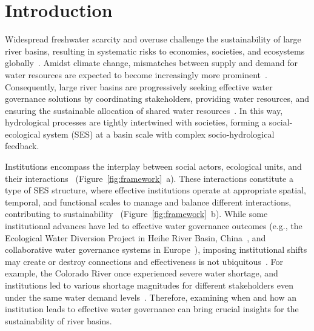\documentclass[preprint, 12pt]{elsarticle}
\begin{document}
\section{Introduction}\label{sec:introduction}
Widespread freshwater scarcity and overuse challenge the sustainability of large river basins, resulting in systematic risks to economies, societies, and ecosystems globally~\cite{distefano2017, dolan2021, xu2020b, mekonnen2016}.
Amidst climate change, mismatches between supply and demand for water resources are expected to become increasingly more prominent~\cite{florke2018, yoon2021}.
Consequently, large river basins are progressively seeking effective water governance solutions by coordinating stakeholders, providing water resources, and ensuring the sustainable allocation of shared water resources~\cite{wang2019d}.
In this way, hydrological processes are tightly intertwined with societies, forming a social-ecological system (SES) at a basin scale with complex socio-hydrological feedback.

Institutions encompass the interplay between social actors, ecological units, and their interactions~\cite{young2008, lien2020, bodin2017b, wang2022g} (Figure~\ref{fig:framework}~a).
These interactions constitute a type of SES structure, where effective institutions operate at appropriate spatial, temporal, and functional scales to manage and balance different interactions, contributing to sustainability~\cite{epstein2015, wang2019d} (Figure~\ref{fig:framework}~b).
While some institutional advances have led to effective water governance outcomes (e.g., the Ecological Water Diversion Project in Heihe River Basin, China~\cite{wang2019d}, and collaborative water governance systems in Europe~\cite{green2013}), imposing institutional shifts may create or destroy connections and effectiveness is not ubiquitous~\cite{loos2022}.
For example, the Colorado River once experienced severe water shortage, and institutions led to various shortage magnitudes for different stakeholders even under the same water demand levels~\cite{hadjimichael2020}.
Therefore, examining when and how an institution leads to effective water governance can bring crucial insights for the sustainability of river basins.
\end{document}
